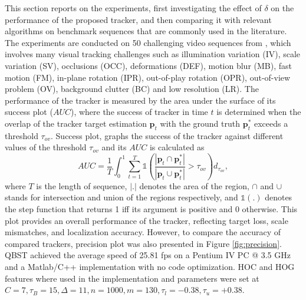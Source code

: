 \documentclass[10pt, conference, compsocconf]{IEEEtran}
\begin{document}
This section reports on the experiments, first investigating the effect of $\delta$ on the performance of the proposed tracker, and then comparing it with relevant algorithms on benchmark sequences that are commonly used in the literature. The experiments are conducted on 50 challenging video sequences from \cite{wu2013online}, which involves many visual tracking challenges such as illumination variation (IV), scale variation (SV), occlusions (OCC), deformations (DEF), motion blur (MB), fast motion (FM), in-plane rotation (IPR), out-of-play rotation (OPR), out-of-view problem (OV), background clutter (BC) and low resolution (LR). The performance of the tracker is measured by the area under the surface of its success plot ($AUC$), where the success of tracker in time $t$ is determined when the overlap of the tracker target estimation $\mathbf{p}_t$  with the ground truth $\mathbf{p}_t^*$ exceeds a threshold $\tau_{ov}$. Success plot, graphs the success of the tracker against different values of the threshold $\tau_{ov}$ and its $AUC$ is calculated as
\begin{equation}
AUC = \frac{1}{T} \int_0^1 \sum_{t=1}^T \mathds{1} \left( \frac{ | \mathbf{p}_t \cap \mathbf{p}_t^* | }{ | \mathbf{p}_t \cup \mathbf{p}_t^* | } > \tau_{ov} \right) d_{\tau_{ov}},
\end{equation}
where $T$ is the length of sequence, $|.|$ denotes the area of the region, $\cap$ and $\cup$ stands for intersection and union of the regions respectively, and $\mathds{1}(.)$ denotes the step function that returns 1 iff its argument is positive and 0 otherwise. This plot provides an overall performance of the tracker, reflecting target loss, scale mismatches, and localization accuracy. However, to compare the accuracy of compared trackers, precision plot was also presented in Figure \ref{fig:precision}. QBST achieved the average speed of 25.81 fps on a Pentium IV PC @ 3.5 GHz and a Matlab/C++ implementation with no code optimization. HOC and HOG features where used in the implementation and parameters were set at $C = 7, \tau_B = 15, \Delta = 11, n = 1000, m = 130, \tau_l = -0.38 , \tau_u = +0.38$.
\end{document}
